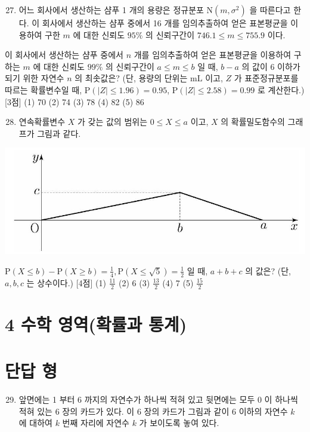 \documentclass[10pt]{article}
\begin{document}
\begin{enumerate}
  \setcounter{enumi}{26}
  \item 어느 회사에서 생산하는 샴푸 1 개의 용량은 정규분포 $\mathrm{N}\left(m, \sigma^{2}\right)$ 을 따른다고 한다. 이 회사에서 생산하는 샴푸 중에서 16 개를 임의추출하여 얻은 표본평균을 이용하여 구한 $m$ 에 대한 신뢰도 $95 \%$ 의 신뢰구간이 $746.1 \leq m \leq 755.9$ 이다.
\end{enumerate}

이 회사에서 생산하는 샴푸 중에서 $n$ 개를 임의추출하여 얻은 표본평균을 이용하여 구하는 $m$ 에 대한 신뢰도 $99 \%$ 의 신뢰구간이 $a \leq m \leq b$ 일 때, $b-a$ 의 값이 6 이하가 되기 위한 자연수 $n$ 의 최솟값은? (단, 용량의 단위는 $\mathrm{mL}$ 이고, $Z$ 가 표준정규분포를 따르는 확률변수일 때, $\mathrm{P}(|Z| \leq 1.96)=0.95$, $\mathrm{P}(|Z| \leq 2.58)=0.99$ 로 계산한다.) [3점]
(1) 70
(2) 74
(3) 78
(4) 82
(5) 86

\begin{enumerate}
  \setcounter{enumi}{27}
  \item 연속확률변수 $X$ 가 갖는 값의 범위는 $0 \leq X \leq a$ 이고, $X$ 의 확률밀도함수의 그래프가 그림과 같다.
\end{enumerate}

\begin{center}
\includegraphics[max width=\textwidth]{2023_06_06_b380aa8523ec7afae994g-31}
\end{center}

$\mathrm{P}(X \leq b)-\mathrm{P}(X \geq b)=\frac{1}{4}, \mathrm{P}(X \leq \sqrt{5})=\frac{1}{2}$ 일 때, $a+b+c$ 의 값은? (단, $a, b, c$ 는 상수이다.) [4점]
(1) $\frac{11}{2}$
(2) 6
(3) $\frac{13}{2}$
(4) 7
(5) $\frac{15}{2}$

\section{4 수학 영역(확률과 통계)}
\section{단답 형}
\begin{enumerate}
  \setcounter{enumi}{28}
  \item 앞면에는 1 부터 6 까지의 자연수가 하나씩 적혀 있고 뒷면에는 모두 0 이 하나씩 적혀 있는 6 장의 카드가 있다. 이 6 장의 카드가 그림과 같이 6 이하의 자연수 $k$ 에 대하여 $k$ 번째 자리에 자연수 $k$ 가 보이도록 놓여 있다.
\end{enumerate}
\end{document}

